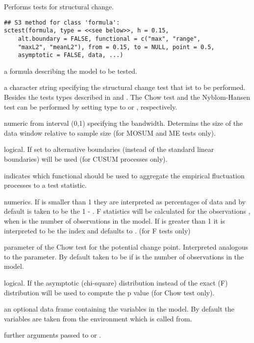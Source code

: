 \begin{Description}\relax
Performs tests for structural change.\end{Description}
\begin{Usage}
\begin{verbatim}
## S3 method for class 'formula':
sctest(formula, type = <<see below>>, h = 0.15,
    alt.boundary = FALSE, functional = c("max", "range",
    "maxL2", "meanL2"), from = 0.15, to = NULL, point = 0.5,
    asymptotic = FALSE, data, ...)
\end{verbatim}
\end{Usage}
\begin{Arguments}
\begin{ldescription}
\item[\code{formula}] a formula describing the model to be tested.
\item[\code{type}] a character string specifying the structural change test that ist
to be performed. Besides the tests types described in 
and . The Chow test and the Nyblom-Hansen test
can be performed by setting type to  or ,
respectively.
\item[\code{h}] numeric from interval (0,1) specifying the bandwidth. Determins the
size of the data window relative to sample size (for MOSUM and ME tests
only).
\item[\code{alt.boundary}] logical. If set to  alternative boundaries
(instead of the standard linear boundaries) will be used (for CUSUM
processes only).
\item[\code{functional}] indicates which functional should be used to aggregate
the empirical fluctuation processes to a test statistic.
\item[\code{from, to}] numerics. If  is smaller than 1 they are
interpreted as percentages of data and by default  is taken to be
the 1 - . F statistics will be calculated for the observations
, when  is the number of observations in the
model. If  is greater than 1 it is interpreted to be the index
and  defaults to . (for F tests only)
\item[\code{point}] parameter of the Chow test for the potential change point.
Interpreted analogous to the  parameter. By
default taken to be  if  is the  number of
observations in the model.
\item[\code{asymptotic}] logical. If  the asymptotic (chi-square)
distribution instead of the exact (F) distribution will be used to compute
the p value (for Chow test only).
\item[\code{data}] an optional data frame containing the variables in the model. By
default the variables are taken from the environment which
 is called from.
\item[\code{...}] further arguments passed to  or
.
\end{ldescription}
\end{Arguments}
